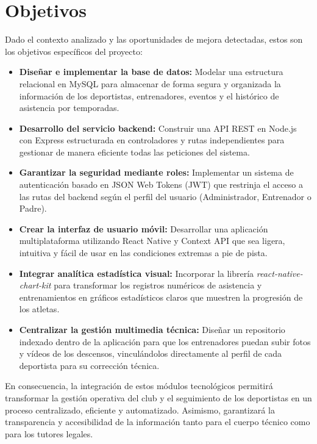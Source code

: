     \newpage
    
    \section{Objetivos}
    Dado el contexto analizado y las oportunidades de mejora detectadas, estos son los objetivos específicos del proyecto:

    \begin{itemize}
        \item \textbf{Diseñar e implementar la base de datos:} Modelar una estructura relacional en MySQL para almacenar de forma segura y organizada la información de los deportistas, entrenadores, eventos y el histórico de asistencia por temporadas.
        
        \item \textbf{Desarrollo del servicio backend:} Construir una API REST en Node.js con Express estructurada en controladores y rutas independientes para gestionar de manera eficiente todas las peticiones del sistema.
        
        \item \textbf{Garantizar la seguridad mediante roles:} Implementar un sistema de autenticación basado en JSON Web Tokens (JWT) que restrinja el acceso a las rutas del backend según el perfil del usuario (Administrador, Entrenador o Padre).
        
        \item \textbf{Crear la interfaz de usuario móvil:} Desarrollar una aplicación multiplataforma utilizando React Native y Context API que sea ligera, intuitiva y fácil de usar en las condiciones extremas a pie de pista.
        
        \item \textbf{Integrar analítica estadística visual:} Incorporar la librería \textit{react-native-chart-kit} para transformar los registros numéricos de asistencia y entrenamientos en gráficos estadísticos claros que muestren la progresión de los atletas.
        
        \item \textbf{Centralizar la gestión multimedia técnica:} Diseñar un repositorio indexado dentro de la aplicación para que los entrenadores puedan subir fotos y vídeos de los descensos, vinculándolos directamente al perfil de cada deportista para su corrección técnica.
    \end{itemize}

    En consecuencia, la integración de estos módulos tecnológicos permitirá transformar la gestión operativa del club y el seguimiento de los deportistas en un proceso centralizado, eficiente y automatizado. Asimismo, garantizará la transparencia y accesibilidad de la información tanto para el cuerpo técnico como para los tutores legales.